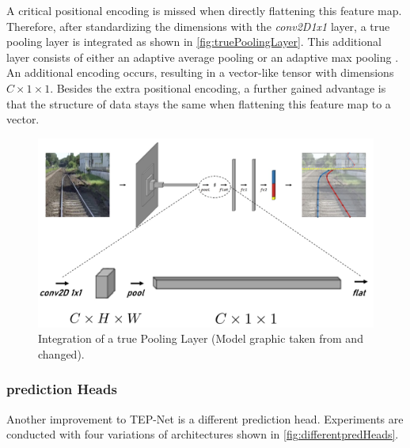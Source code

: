 A critical positional encoding is missed when directly flattening this feature map.
Therefore, after standardizing the dimensions with the \textit{conv2D1x1} layer, a true pooling layer is integrated as shown in \autoref{fig:truePoolingLayer}.
This additional layer consists of either an adaptive average pooling \cite{pytorch_averagePool_docu} or an adaptive max pooling \cite{pytorch_maxPool_docu}.
An additional encoding occurs, resulting in a vector-like tensor with dimensions $C \times 1 \times 1$.
Besides the extra positional encoding, a further gained advantage is that the structure of data stays the same when flattening this feature map to a vector.

\begin{figure}[H]
    \centering
    \includegraphics[width=0.7\linewidth]{PICs/improvedModel/poolingLayers.jpg}
    \caption{Integration of a true Pooling Layer (Model graphic taken from \cite{tepNet2024} and changed).}
    \label{fig:truePoolingLayer}
\end{figure}

\subsubsection{prediction Heads}
\label{subsubsec:predictionheads}

Another improvement to \ac{TEP}-Net \cite{tepNet2024} is a different prediction head.
Experiments are conducted with four variations of architectures shown in \autoref{fig:differentpredHeads}.

